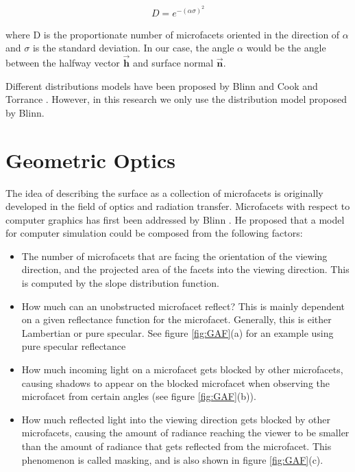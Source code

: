 	\begin{eqnarray*}
		D = e^{-(\alpha \sigma)^2}
	\end{eqnarray*}

\noindent where D is the proportionate number of microfacets oriented in the direction of $\alpha$ and $\sigma$ is the standard deviation. In our case,  the angle $\alpha$ would be the angle between the halfway vector $\vec{\mathbf{h}}$ and surface normal $\vec{\mathbf{n}}$.

Different distributions models have been proposed by Blinn \cite{Blinn} and Cook and Torrance \cite{DigitalModeling}. However, in this research we only use the distribution model proposed by Blinn.

\section{Geometric Optics}
The idea of describing the surface as a collection of microfacets is originally developed in the field of optics and radiation transfer. Microfacets with respect to computer graphics has first been addressed by Blinn \cite{Blinn}. He proposed that a model for computer simulation could be composed from the following factors:

\begin{itemize}
	\item{ The number of microfacets that are facing the orientation of the viewing direction, and the projected area of the facets into the viewing direction. This is computed by the slope distribution function. }
	\item{ How much can an unobstructed microfacet reflect? This is mainly dependent on a given reflectance function for the microfacet. Generally, this is  either Lambertian or pure specular. See figure \ref{fig:GAF}(a) for an example using pure specular reflectance}
	\item{ How much incoming light on a microfacet gets blocked by other microfacets, causing shadows to appear on the blocked microfacet when observing the microfacet from certain angles (see figure \ref{fig:GAF}(b)).} 
	\item{ How much reflected light into the viewing direction gets blocked by other microfacets, causing the amount of radiance reaching the viewer to be smaller than the amount of radiance that gets reflected from the microfacet. This phenomenon is called masking, and is also shown in figure \ref{fig:GAF}(c). }
\end{itemize}

